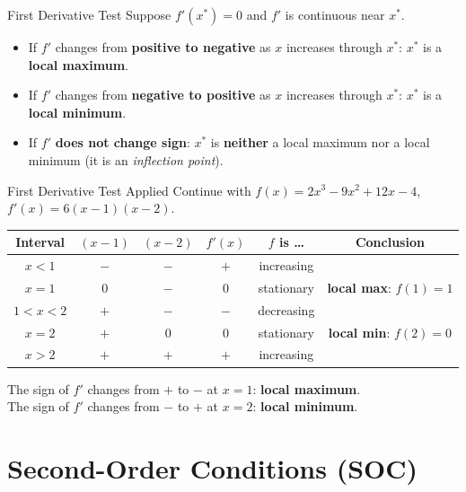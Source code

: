 \documentclass[12pt, a4paper]{article}
\theoremstyle{definition}
\begin{document}
\begin{thmbox}{First Derivative Test}
Suppose $f'(x^*) = 0$ and $f'$ is continuous near $x^*$.
\begin{itemize}
  \item If $f'$ changes from \textbf{positive to negative} as $x$ increases
        through $x^*$: \quad $x^*$ is a \textbf{local maximum}.
  \item If $f'$ changes from \textbf{negative to positive} as $x$ increases
        through $x^*$: \quad $x^*$ is a \textbf{local minimum}.
  \item If $f'$ \textbf{does not change sign}: \quad $x^*$ is
        \textbf{neither} a local maximum nor a local minimum
        (it is an \emph{inflection point}).
\end{itemize}
\end{thmbox}

\begin{exbox}{First Derivative Test Applied}
Continue with $f(x)=2x^3-9x^2+12x-4$, $f'(x)=6(x-1)(x-2)$.

\medskip
\begin{center}
\begin{tabular}{cccccc}
  \toprule
  \rowcolor{tabhead}
  \color{white}Interval
    & \color{white}$(x-1)$
    & \color{white}$(x-2)$
    & \color{white}$f'(x)$
    & \color{white}$f$ is \ldots
    & \color{white}Conclusion \\
  \midrule
  $x<1$   & $-$ & $-$ & $+$ & increasing & \\
  \rowcolor{tabeven}
  $x=1$   & $0$ & $-$ & $0$ & stationary & \textbf{local max}: $f(1)=1$ \\
  $1<x<2$ & $+$ & $-$ & $-$ & decreasing & \\
  \rowcolor{tabeven}
  $x=2$   & $+$ & $0$ & $0$ & stationary & \textbf{local min}: $f(2)=0$ \\
  $x>2$   & $+$ & $+$ & $+$ & increasing & \\
  \bottomrule
\end{tabular}
\end{center}

\medskip
The sign of $f'$ changes from $+$ to $-$ at $x=1$: \textbf{local maximum}.\\
The sign of $f'$ changes from $-$ to $+$ at $x=2$: \textbf{local minimum}.
\end{exbox}

\section{Second-Order Conditions (SOC)}
\end{document}
